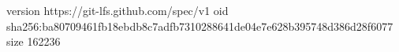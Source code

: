 version https://git-lfs.github.com/spec/v1
oid sha256:ba80709461fb18ebdb8c7adfb7310288641de04e7e628b395748d386d28f6077
size 162236
